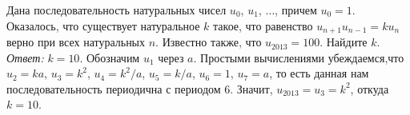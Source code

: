 \problem{}
Дана последовательность натуральных чисел $u_0$, $u_1$, $\ldots$, причем
$u_0 = 1$.
Оказалось, что существует натуральное $k$ такое, что равенство
$u_{n+1} u_{n-1} = k u_n$ верно при всех натуральных $n$.
Известно также, что $u_{2013} = 100$.
Найдите $k$.
\solution
\emph{Ответ:} $k = 10$.
Обозначим $u_1$ через $a$.
Простыми вычислениями убеждаемся,что
$u_2 = k a$, $u_3 = k^2$, $u_4 = k^2 / a$, $u_5 = k / a$, $u_6 = 1$, $u_7 = a$,
то есть данная нам последовательность периодична с периодом 6.
Значит, $u_{2013} = u_3 = k^2$, откуда $k = 10$.
\endproblem
